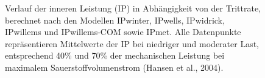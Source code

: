 \documentclass[
  letterpaper,
  DIV=11]{scrartcl}
\begin{document}
\begin{figure}


\caption{\label{fig-Modellverlgeich_1}Verlauf der inneren Leistung (IP)
in Abhängigkeit von der Trittrate, berechnet nach den Modellen IPwinter,
IPwells, IPwidrick, IPwillems und IPwillems-COM sowie IPmet. Alle
Datenpunkte repräsentieren Mittelwerte der IP bei niedriger und
moderater Last, entsprechend 40\% und 70\% der mechanischen Leistung bei
maximalem Sauerstoffvolumenstrom (Hansen et al., 2004).}

\end{figure}%
\end{document}
